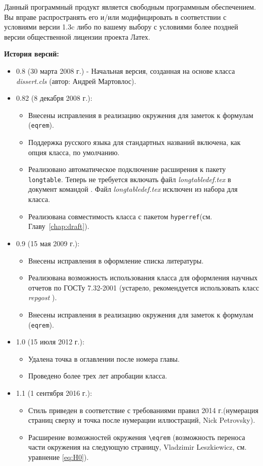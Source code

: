 Данный программный продукт является свободным программным обеспечением. Вы вправе распространять его и/или модифицировать в соответствии с условиями версии 1.3c либо по вашему выбору с условиями более поздней версии общественной лицензии проекта Латех.


\newpage
{\large \bfseries История версий:}
\begin{itemize}
 \item 0.8 (30 марта 2008 г.) - Начальная версия, созданная на основе класса {\itshape
dissert.cls} (автор: Андрей Мартовлос).
 \item 0.82 (8 декабря 2008 г.):
\begin{itemize}
 \item Внесены исправления в реализацию окружения для заметок к формулам
(\verb|eqrem|).
 \item Поддержка русского языка для стандартных названий включена, как опция
класса, по умолчанию.
 \item Реализовано автоматическое подключение расширения к пакету
\verb|longtable|. Теперь не требуется включать файл {\itshape longtabledef.tex}
в документ командой \verb||. Файл {\itshape longtabledef.tex} исключен
из набора для класса.
 \item Реализована совместимость класса с пакетом \verb|hyperref|(см.
Главу~\ref{chap:draft}).
\end{itemize}
 \item 0.9 (15 мая 2009 г.):
\begin{itemize}
 \item Внесены исправления в оформление списка литературы.
 \item Реализована возможность использования класса для оформления научных
отчетов по ГОСТу 7.32-2001 (устарело, рекомендуется использовать класс {\itshape repgost} \cite{repgost}).
 \item Внесены исправления в реализацию окружения для заметок к формулам
(\verb|eqrem|).
\end{itemize}

 \item 1.0 (15 июля 2012 г.):
\begin{itemize}
	\item Удалена точка в оглавлении после номера главы.
	\item Проведено более трех лет апробации класса.
\end{itemize}

 \item 1.1 (1 сентября 2016 г.):
\begin{itemize}
	\item Стиль приведен в соответствие с требованиями правил 2014 г.(нумерация страниц сверху и точка после нумерации иллюстраций, Nick Petrovsky).
	\item Расширение возможностей окружения \verb|\eqrem| (возможность переноса части окружения на следующую страницу, Vladzimir Leszkiewicz, см. уравнение \ref{eq:H0}).
\end{itemize}

\end{itemize}



